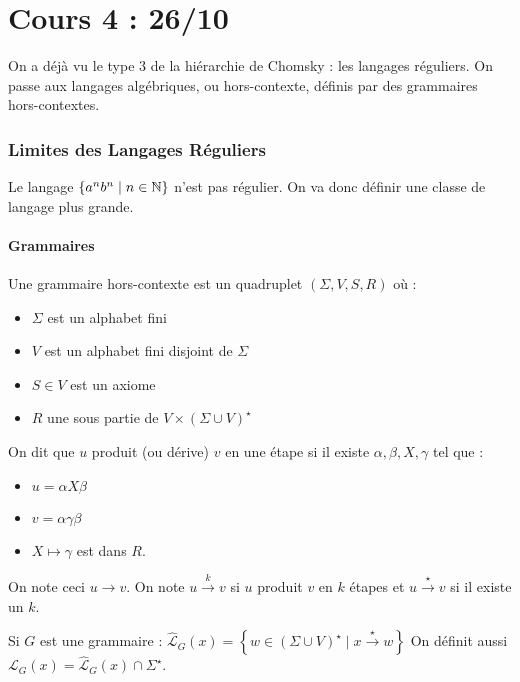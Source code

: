 \documentclass{cours}
\begin{document}
\part[Langages Algébriques]{Cours 4 : 26/10}
On a déjà vu le type 3 de la hiérarchie de Chomsky : les langages réguliers. On passe aux langages algébriques, ou hors-contexte, définis par des grammaires hors-contextes.

\section{Limites des Langages Réguliers}
Le langage $\{a^{n}b^{n}\mid n\in \mathbb{N}\}$ n'est pas régulier. On va donc définir une classe de langage plus grande.

\subsection{Grammaires}
\begin{definition}
    Une grammaire hors-contexte est un quadruplet $(\Sigma, V, S, R)$ où :
    \begin{itemize}
        \item $\Sigma$ est un alphabet fini
        \item $V$ est un alphabet fini disjoint de $\Sigma$
        \item $S\in V$ est un axiome
        \item $R$ une sous partie de $V \times (\Sigma \cup V)^{\star}$
    \end{itemize}    
\end{definition}

\begin{definition}
    On dit que $u$ produit (ou dérive) $v$ en une étape si il existe $\alpha, \beta, X, \gamma$ tel que : 
    \begin{itemize}
        \item $u = \alpha X \beta$
        \item $v = \alpha \gamma \beta$
        \item $X \mapsto \gamma$ est dans $R$.
    \end{itemize}
    On note ceci $u \rightarrow v$. On note $u \xrightarrow{k} v$ si $u$ produit $v$ en $k$ étapes et $u \xrightarrow{\star} v$ si il existe un $k$.
\end{definition}

\begin{definition}
    Si $G$ est une grammaire : $\hat{\mathcal{L}}_{G}(x) = \left\{w \in \left(\Sigma \cup V\right)^{\star}\mid x \xrightarrow{\star} w \right\}$
    On définit aussi $\mathcal{L}_{G}(x) = \hat{\mathcal{L}}_{G}(x) \cap \Sigma^{\star}$.
\end{definition}
\end{document}
